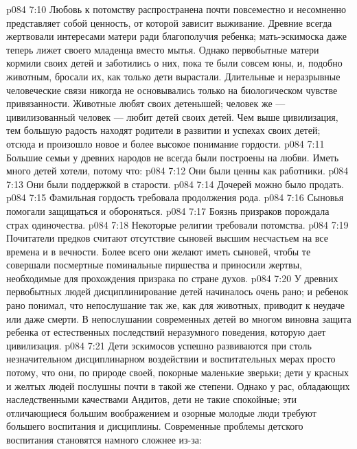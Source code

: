 \vs p084 7:10 \pc Любовь к потомству распространена почти повсеместно и несомненно представляет собой ценность, от которой зависит выживание. Древние всегда жертвовали интересами матери ради благополучия ребенка; мать\hyp{}эскимоска даже теперь лижет своего младенца вместо мытья. Однако первобытные матери кормили своих детей и заботились о них, пока те были совсем юны, и, подобно животным, бросали их, как только дети вырастали. Длительные и неразрывные человеческие связи никогда не основывались только на биологическом чувстве привязанности. Животные любят своих детенышей; человек же --- цивилизованный человек --- любит детей своих детей. Чем выше цивилизация, тем большую радость находят родители в развитии и успехах своих детей; отсюда и произошло новое и более высокое понимание  гордости.
\vs p084 7:11 Большие семьи у древних народов не всегда были построены на любви. Иметь много детей хотели, потому что:
\vs p084 7:12 \bibnobreakspace Они были ценны как работники.
\vs p084 7:13 \bibnobreakspace Они были поддержкой в старости.
\vs p084 7:14 \bibnobreakspace Дочерей можно было продать.
\vs p084 7:15 \bibnobreakspace Фамильная гордость требовала продолжения рода.
\vs p084 7:16 \bibnobreakspace Сыновья помогали защищаться и обороняться.
\vs p084 7:17 \bibnobreakspace Боязнь призраков порождала страх одиночества.
\vs p084 7:18 \bibnobreakspace Некоторые религии требовали потомства.
\vs p084 7:19 \pc Почитатели предков считают отсутствие сыновей высшим несчастьем на все времена и в вечности. Более всего они желают иметь сыновей, чтобы те совершали посмертные поминальные пиршества и приносили жертвы, необходимые для прохождения призрака по стране духов.
\vs p084 7:20 У древних первобытных людей дисциплинирование детей начиналось очень рано; и ребенок рано понимал, что непослушание так же, как для животных, приводит к неудаче или даже смерти. В непослушании современных детей во многом виновна защита ребенка от естественных последствий неразумного поведения, которую дает цивилизация.
\vs p084 7:21 Дети эскимосов успешно развиваются при столь незначительном дисциплинарном воздействии и воспитательных мерах просто потому, что они, по природе своей, покорные маленькие зверьки; дети у красных и желтых людей послушны почти в такой же степени. Однако у рас, обладающих наследственными качествами Андитов, дети не такие спокойные; эти отличающиеся большим воображением и озорные молодые люди требуют большего воспитания и дисциплины. Современные проблемы детского воспитания становятся намного сложнее из\hyp{}за:
